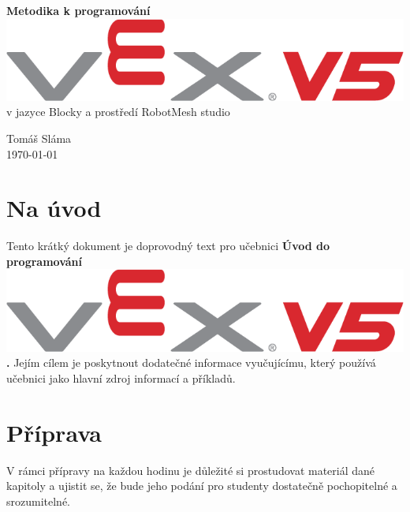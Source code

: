 


\begin{titlepage}
    \begin{center}
        \vspace*{3em}
        \Huge
				\textbf{Metodika k programování} \includegraphics[height=0.65\baselineskip]{Images/vex-logo.png}
				\\
				\Large
        \vspace*{0.5em}
				v jazyce Blocky a prostředí RobotMesh studio

        \vfill

        \flushright
        \normalsize
				Tomáš Sláma\\
				\today
    \end{center}
\end{titlepage}

\tableofcontents
\clearpage

\setcounter{secnumdepth}{0}

\section{Na úvod}
Tento krátký dokument je doprovodný text pro učebnici \textbf{Úvod do programování \includegraphics[height=0.65\baselineskip]{Images/vex-logo.png}.} Jejím cílem je poskytnout dodatečné informace vyučujícímu, který používá učebnici jako hlavní zdroj informací a příkladů.

\errata

\newpage

\section{Příprava}
V rámci přípravy na každou hodinu je důležité si prostudovat materiál dané kapitoly a ujistit se, že bude jeho podání pro studenty dostatečně pochopitelné a srozumitelné.

